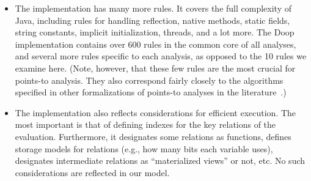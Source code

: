 \begin{itemize}
\item The implementation has many more rules. It covers the full
  complexity of Java, including rules for handling reflection, native
  methods, static fields, string constants, implicit initialization,
  threads, and a lot more. The Doop
  implementation
  contains over 600 rules in the common core of all analyses, and
  several more rules specific to each analysis, as opposed to the 10
  rules we examine here. (Note, however, that these few rules are the
  most crucial for points-to analysis. They also correspond fairly
  closely to the algorithms specified in other formalizations of
  points-to analyses in the
  literature~\cite{pldi:2010:Might,popl:2011:Smaragdakis}.)

\item The implementation also reflects considerations for efficient
  execution. The most important is that of defining indexes for the
  key relations of the evaluation. Furthermore, it designates some
  relations as functions, defines storage models for relations (e.g.,
  how many bits each variable uses), designates intermediate relations
  as ``materialized views'' or not, etc. No such considerations are
  reflected in our model.
\end{itemize}



